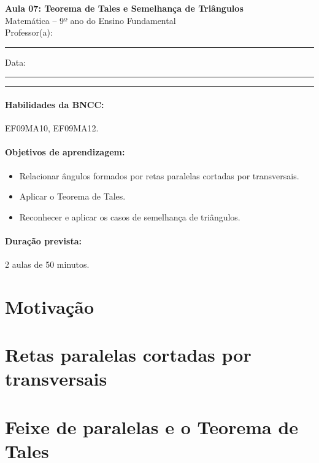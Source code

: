 \documentclass[11pt,a4paper]{article}
\newcommand{\numaula}{07}
\newcommand{\tituloaula}{Teorema de Tales e Semelhança de Triângulos}
\begin{document}
\begin{center}
  {\Large\bfseries Aula \numaula: \tituloaula}\\[4pt]
  {\large Matemática -- 9º ano do Ensino Fundamental}\\[2pt]
  Professor(a): \rule{6cm}{0.4pt} \qquad Data: \rule{3cm}{0.4pt}
\end{center}
\noindent\rule{\linewidth}{0.8pt}

\paragraph{Habilidades da BNCC:} EF09MA10, EF09MA12.

\paragraph{Objetivos de aprendizagem:}
\begin{itemize}[nosep]
  \item Relacionar ângulos formados por retas paralelas cortadas por transversais.
  \item Aplicar o Teorema de Tales.
  \item Reconhecer e aplicar os casos de semelhança de triângulos.
\end{itemize}

\paragraph{Duração prevista:} 2 aulas de 50 minutos. %

\section{Motivação}

\section{Retas paralelas cortadas por transversais}

\section{Feixe de paralelas e o Teorema de Tales}
\end{document}
